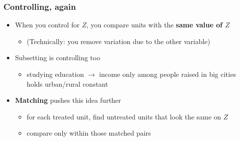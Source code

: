 \begin{frame}
\frametitle{Controlling, again}
\centering

\begin{itemize}
  \item When you control for $Z$, you compare units with the \textbf{same value of $Z$}
  \begin{itemize}
    \item (Technically: you remove variation due to the other variable)
  \end{itemize}
  \vspace{8pt}
  \item Subsetting is controlling too
  \begin{itemize}
    \item studying education $\rightarrow$ income only among people raised in big cities holds urban/rural constant
  \end{itemize}
  \vspace{8pt}
  \item<2-> \textbf{Matching} pushes this idea further
  \begin{itemize}
    \item for each treated unit, find untreated units that look the same on $Z$
    \item compare only within those matched pairs
  \end{itemize}
\end{itemize}

\end{frame}

